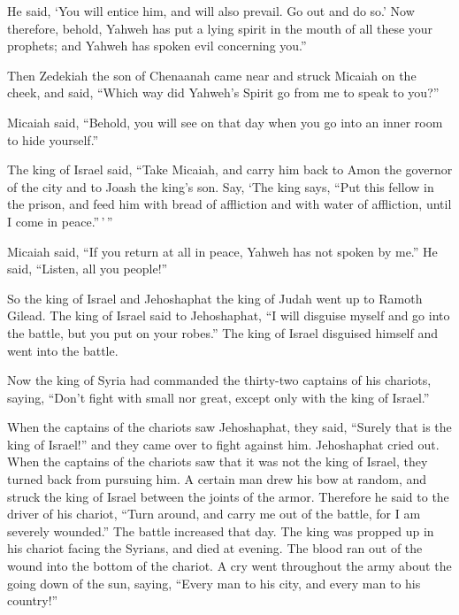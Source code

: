 He said, `You will entice him, and will also prevail. Go out and do so.'
 Now therefore, behold, Yahweh has put a lying spirit in
the mouth of all these your prophets; and Yahweh has spoken evil
concerning you.''

 Then Zedekiah the son of Chenaanah came near and struck
Micaiah on the cheek, and said, ``Which way did Yahweh's Spirit go from
me to speak to you?''

 Micaiah said, ``Behold, you will see on that day when you
go into an inner room to hide yourself.''

 The king of Israel said, ``Take Micaiah, and carry him
back to Amon the governor of the city and to Joash the king's son.
 Say, `The king says, ``Put this fellow in the prison, and
feed him with bread of affliction and with water of affliction, until I
come in peace.''\,'\,''

 Micaiah said, ``If you return at all in peace, Yahweh has
not spoken by me.'' He said, ``Listen, all you people!''

 So the king of Israel and Jehoshaphat the king of Judah
went up to Ramoth Gilead.  The king of Israel said to
Jehoshaphat, ``I will disguise myself and go into the battle, but you
put on your robes.'' The king of Israel disguised himself and went into
the battle.

 Now the king of Syria had commanded the thirty-two
captains of his chariots, saying, ``Don't fight with small nor great,
except only with the king of Israel.''

 When the captains of the chariots saw Jehoshaphat, they
said, ``Surely that is the king of Israel!'' and they came over to fight
against him. Jehoshaphat cried out.  When the captains of
the chariots saw that it was not the king of Israel, they turned back
from pursuing him.  A certain man drew his bow at random,
and struck the king of Israel between the joints of the armor. Therefore
he said to the driver of his chariot, ``Turn around, and carry me out of
the battle, for I am severely wounded.''  The battle
increased that day. The king was propped up in his chariot facing the
Syrians, and died at evening. The blood ran out of the wound into the
bottom of the chariot.  A cry went throughout the army
about the going down of the sun, saying, ``Every man to his city, and
every man to his country!''

